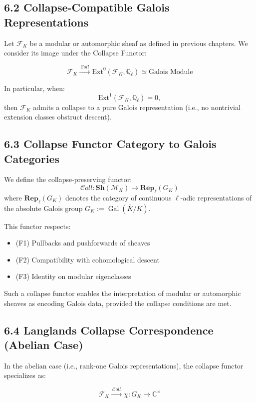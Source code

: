 \documentclass[11pt]{article}
\begin{document}
\subsection{6.2 Collapse-Compatible Galois Representations}

Let \( \mathcal{F}_K \) be a modular or automorphic sheaf as defined in previous chapters.  
We consider its image under the Collapse Functor:

\[
\mathcal{F}_K \xrightarrow{\ \mathcal{C}oll\ } \mathrm{Ext}^0(\mathcal{F}_K, \mathbb{Q}_\ell) \simeq \text{Galois Module}
\]

In particular, when:
\[
\mathrm{Ext}^1(\mathcal{F}_K, \mathbb{Q}_\ell) = 0,
\]
then \( \mathcal{F}_K \) admits a collapse to a pure Galois representation (i.e., no nontrivial extension classes obstruct descent).

\subsection{6.3 Collapse Functor Category to Galois Categories}

We define the collapse-preserving functor:
\[
\mathcal{C}oll : \mathbf{Sh}(\mathcal{M}_K) \longrightarrow \mathbf{Rep}_{\ell}(G_K)
\]
where \( \mathbf{Rep}_{\ell}(G_K) \) denotes the category of continuous \( \ell \)-adic representations of the absolute Galois group \( G_K := \operatorname{Gal}(\overline{K}/K) \).

This functor respects:
\begin{itemize}
    \item (F1) Pullbacks and pushforwards of sheaves
    \item (F2) Compatibility with cohomological descent
    \item (F3) Identity on modular eigenclasses
\end{itemize}

Such a collapse functor enables the interpretation of modular or automorphic sheaves as encoding Galois data, provided the collapse conditions are met.

\subsection{6.4 Langlands Collapse Correspondence (Abelian Case)}

In the abelian case (i.e., rank-one Galois representations), the collapse functor specializes as:

\[
\mathcal{F}_K \xrightarrow{\ \mathcal{C}oll\ } \chi : G_K \to \mathbb{C}^\times
\]
\end{document}
